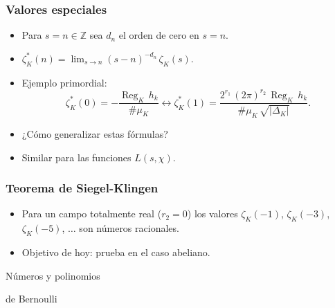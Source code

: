 \documentclass[handout]{beamer}
\newcommand{\ZZ}{\mathbb{Z}}
\DeclareMathOperator{\Reg}{Reg}
\begin{document}
\begin{frame}
  \frametitle{Valores especiales}

  \begin{itemize}
  \item<1-> Para $s = n \in \ZZ$ sea $d_n$ el orden de cero en $s = n$.

  \item<2-> $\zeta_K^* (n) = \lim_{s \to n} (s-n)^{-d_n}\,\zeta_K (s)$.

  \item<3-> Ejemplo primordial:
    \[ \zeta_K^* (0) = -\frac{\Reg_K\,h_k}{\# \mu_K}
      \longleftrightarrow
      \zeta_K^* (1) = \frac{2^{r_1}\,(2\pi)^{r_2}\,\Reg_K\,h_k}{\#\mu_K\,\sqrt{|\Delta_K|}}. \]

  \item<4-> ¿Cómo generalizar estas fórmulas?

  \item<5-> Similar para las funciones $L (s,\chi)$.
  \end{itemize}
\end{frame}


\begin{frame}
  \frametitle{Teorema de Siegel-Klingen}

  \begin{itemize}
  \item<1-> Para un campo totalmente real ($r_2 = 0$) los valores
    $\zeta_K (-1)$, $\zeta_K (-3)$, $\zeta_K (-5)$, $\ldots$ son números racionales.

  \item<2-> Objetivo de hoy: prueba en el caso abeliano.
  \end{itemize}
\end{frame}


\begin{frame}[plain]
  \headingfont

  \begin{center}
    {\huge Números y polinomios

      de Bernoulli

    }
  \end{center}
\end{frame}

\end{document}
